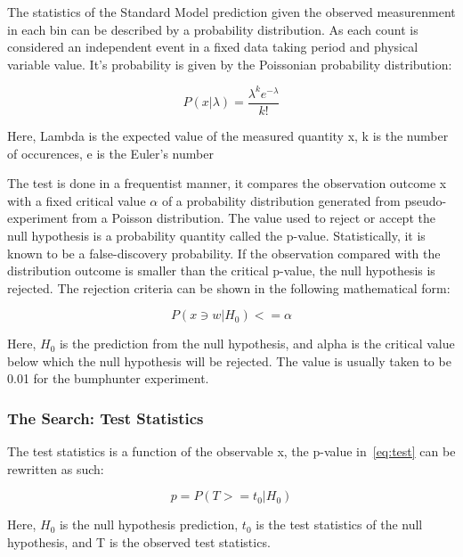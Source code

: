 The statistics of the Standard Model prediction given the observed measurenment in each bin can be described by a probability distribution. As each count is considered an independent event in a fixed data taking period and physical variable value. It's probability is given by the Poissonian probability distribution:

\begin{equation}
 P(x|\lambda) = \frac{\lambda^{k}e^{-\lambda}}{k!} 
 \label{eq:Poissonian}
\end{equation}

Here, Lambda is the expected value of the measured quantity x, k is the number of occurences, e is the Euler's number  

    The test is done in a frequentist manner, it compares the observation outcome x with a fixed critical value $\alpha$ of a probability distribution generated from pseudo-experiment from a Poisson distribution. The value used to reject or accept the null hypothesis is a probability quantity called the p-value. Statistically, it is known to be a false-discovery probability. 
    If the observation compared with the distribution outcome is smaller than the critical p-value, the null hypothesis is rejected. The rejection criteria can be shown in the following mathematical form:

\begin{equation}
    P(x \ni w|H_0)<= \alpha 
    \label{eq:test}
\end{equation}


Here, $H_0$ is the prediction from the null hypothesis, and alpha is the critical value below which the null hypothesis will be rejected. The value is usually taken to be 0.01 for the bumphunter experiment. 

\subsubsection{The Search: Test Statistics}
\label{teststatistics}

The test statistics is a function of the observable x, the p-value in~\ref{eq:test} can be rewritten as such:
    
\begin{equation}
    p = P(T>=t_{0}| H_{0})
\label{eq:p-valuetestStats}
\end{equation}

Here, $H_0$ is the null hypothesis prediction, $t_0$ is the test statistics of the null hypothesis, and T is the observed test statistics.


